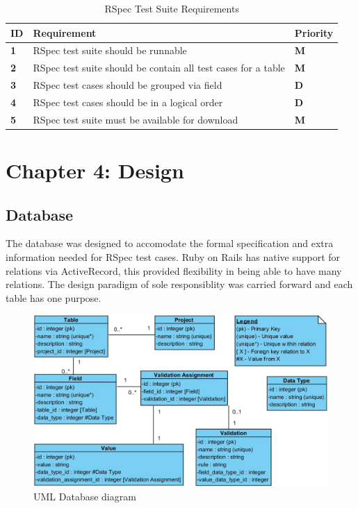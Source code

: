 \documentclass[a4paper,12pt]{article}
\begin{document}
\begin{table}
\centering
\caption{RSpec Test Suite Requirements}
\label{req:3}
\begin{tabularx}{\textwidth}{|l|X|l|}
\hline
\textbf{ID} & \textbf{Requirement}                                          & \textbf{Priority} \\ \hline
\textbf{1}  & RSpec test suite should be runnable                           & \textbf{M}        \\ \hline
\textbf{2}  & RSpec test suite should be contain all test cases for a table & \textbf{M}        \\ \hline
\textbf{3}  & RSpec test cases should be grouped via field                  & \textbf{D}        \\ \hline
\textbf{4}  & RSpec test cases should be in a logical order                 & \textbf{D}        \\ \hline
\textbf{5}  & RSpec test suite must be available for download               & \textbf{M}        \\ \hline
\end{tabularx}
\end{table}

\newpage
\section{Chapter 4: Design}

\subsection{Database}
\par The database was designed to accomodate the formal specification and extra information needed for RSpec test cases. Ruby on Rails has native support for relations via ActiveRecord, this provided flexibility in being able to have many relations. The design paradigm of sole responsiblity was carried forward and each table has one purpose.

\begin{figure}
\includegraphics[width=\linewidth]{screenshots/databaseUML}
\caption{UML Database diagram}
\label{fig:UML1}
\end{figure}
\end{document}

